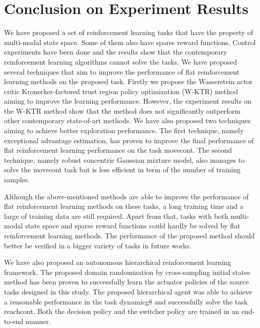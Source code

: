 \section{Conclusion on Experiment Results}
We have proposed a set of reinforcement learning tasks that have the property of multi-modal state space. Some of them also have sparse reward functions. Control experiments have been done and the results show that the contemporary reinforcement learning algorithms cannot solve the tasks.
We have proposed several techniques that aim to improve the performance of flat reinforcement learning methods on the proposed task. Firstly we propose the Wasserstein actor critic Kronecker-factored trust region policy optimization (W-KTR) method aiming to improve the learning performance. However, the experiment results on the W-KTR method show that the method does not significantly outperform other contemporary state-of-art methods. We have also proposed two techniques aiming to achieve better exploration performance. The first technique, namely exceptional advantage estimation, has proven to improve the final performance of flat reinforcement learning performance on the task movecont. The second technique, namely robust concentric Gaussian mixture model, also manages to solve the movecont task but is less efficient in term of the number of training samples. 

Although the above-mentioned methods are able to improve the performance of flat reinforcement learning methods on these tasks, a long training time and a large of training data are still required. Apart from that, tasks with both multi-modal state space and sparse reward functions could hardly be solved by flat reinforcement learning methods. The performance of the proposed method should better be verified in a bigger variety of tasks in future works.

We have also proposed an autonomous hierarchical reinforcement learning framework. The proposed domain randomization by cross-sampling initial states method has been proven to successfully learn the actuator policies of the source tasks designed in this study. The proposed hierarchical agent was able to achieve a reasonable performance in the task dynamicg8 and successfully solve the task reachcont. Both the decision policy and the switcher policy are trained in an end-to-end manner. 